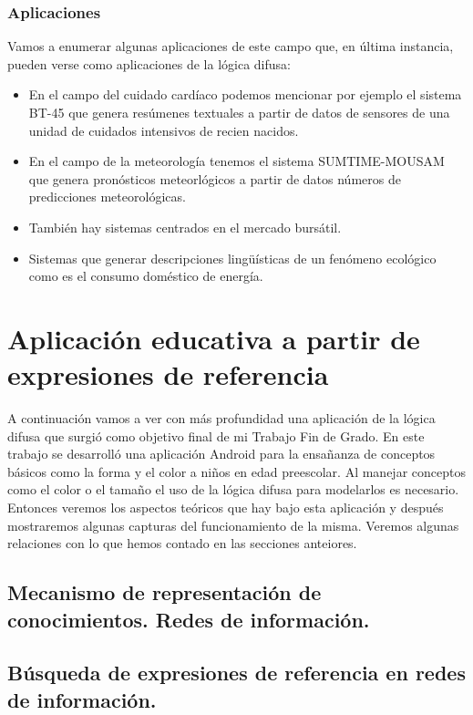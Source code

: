 \documentclass[10pt,a4paper]{article}
\begin{document}
\subsubsection{Aplicaciones}

Vamos a enumerar algunas aplicaciones de este campo que, en última instancia, pueden verse como aplicaciones de la lógica difusa:

\begin{itemize}
\item En el campo del cuidado cardíaco podemos mencionar por ejemplo el sistema BT-45 que genera resúmenes textuales a partir de datos de sensores de una unidad de cuidados intensivos de recien nacidos.
\item En el campo de la meteorología tenemos el sistema SUMTIME-MOUSAM que genera pronósticos meteorlógicos a partir de datos números de predicciones meteorológicas.
\item También hay sistemas centrados en el mercado bursátil.
\item Sistemas que generar descripciones lingüísticas de un fenómeno ecológico como es el consumo doméstico de energía.
\end{itemize}

\section{Aplicación educativa a partir de expresiones de referencia}

A continuación vamos a ver con más profundidad una aplicación de la lógica difusa que surgió como objetivo final de mi Trabajo Fin de Grado. En este trabajo se desarrolló una aplicación Android para la ensañanza de conceptos básicos como la forma y el color a niños en edad preescolar. Al manejar conceptos como el color o el tamaño el uso de la lógica difusa para modelarlos es necesario. Entonces veremos los aspectos teóricos que hay bajo esta aplicación y después mostraremos algunas capturas del funcionamiento de la misma. Veremos algunas relaciones con lo que hemos contado en las secciones anteiores.

\subsection{Mecanismo de representación de conocimientos. Redes de información.}

\subsection{Búsqueda de expresiones de referencia en redes de información.}
\end{document}
